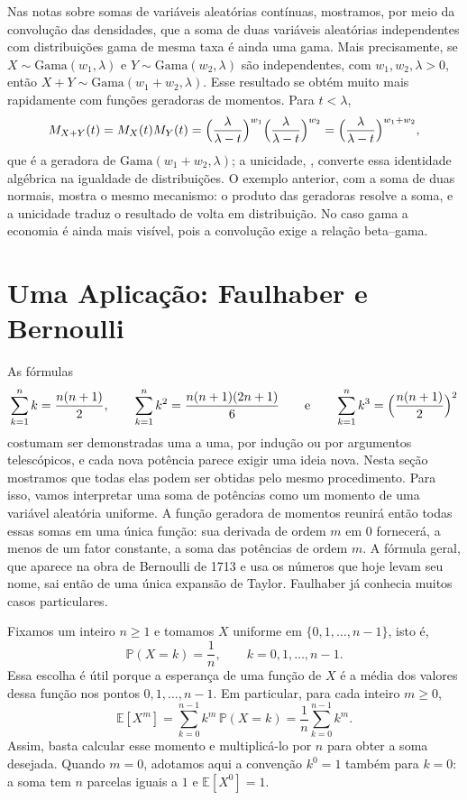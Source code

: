 \documentclass[12pt,portuguese]{article}
\theoremstyle{definition}
\theoremstyle{plainexercise}
\theoremstyle{starredexercise}
\theoremstyle{definition}
\begin{document}
Nas notas sobre somas de variáveis aleatórias contínuas, mostramos, por meio
da convolução das densidades, que a soma de duas variáveis aleatórias
independentes com distribuições gama de mesma taxa é ainda uma gama. Mais precisamente, se
$X\sim\mathrm{Gama}(w_1,\lambda)$ e $Y\sim\mathrm{Gama}(w_2,\lambda)$ são
independentes, com $w_1,w_2,\lambda>0$, então
$X+Y\sim\mathrm{Gama}(w_1+w_2,\lambda)$. Esse resultado
se obtém muito mais rapidamente com funções geradoras de momentos. Para
$t<\lambda$,
\[
M_{X+Y}(t)=M_X(t)M_Y(t)
=\Bigl(\frac{\lambda}{\lambda-t}\Bigr)^{w_1}
 \Bigl(\frac{\lambda}{\lambda-t}\Bigr)^{w_2}
=\Bigl(\frac{\lambda}{\lambda-t}\Bigr)^{w_1+w_2},
\]
que é a geradora de $\mathrm{Gama}(w_1+w_2,\lambda)$; a unicidade,
, converte essa identidade algébrica na igualdade de
distribuições. O exemplo anterior, com a soma de duas normais, mostra o mesmo
mecanismo: o produto das geradoras resolve a soma, e a unicidade traduz o
resultado de volta em distribuição. No caso gama a economia é ainda mais
visível, pois a convolução exige a relação beta--gama.

\section{Uma Aplicação: Faulhaber e Bernoulli}\label{sec:faulhaber}

As fórmulas
\[
\sum_{k=1}^{n}k=\frac{n(n+1)}{2},\qquad
\sum_{k=1}^{n}k^{2}=\frac{n(n+1)(2n+1)}{6}
\qquad\text{e}\qquad
\sum_{k=1}^{n}k^{3}=\Bigl(\frac{n(n+1)}{2}\Bigr)^{2}
\]
costumam ser demonstradas uma a uma, por indução ou por argumentos telescópicos, e cada
nova potência parece exigir uma ideia nova. Nesta seção mostramos que todas
elas podem ser obtidas pelo mesmo procedimento. Para isso, vamos interpretar
uma soma de potências como um momento de uma variável aleatória uniforme.
A função geradora de momentos reunirá então todas essas somas em uma única
função: sua derivada de ordem $m$ em $0$ fornecerá, a menos de um fator
constante, a soma das potências de ordem $m$.
A fórmula geral, que aparece na obra de Bernoulli
de 1713 e usa os números que hoje levam seu nome, sai então de uma única
expansão de Taylor. Faulhaber já conhecia muitos casos particulares.

\bigskip 

Fixamos um inteiro $n\geqslant1$ e tomamos $X$ uniforme em
$\{0,1,\dots,n-1\}$, isto é, 
\[
\mathbb{P}(X=k)= \frac{1}{n}, \qquad k=0,1,\dots,n-1. 
\]
Essa escolha é útil porque a esperança de uma função de $X$ é a média
dos valores dessa função nos pontos $0,1,\dots,n-1$.
Em particular, para cada inteiro $m\geqslant0$,
\[
\mathbb{E}[X^m]=\sum_{k=0}^{n-1}k^m\,\mathbb{P}(X=k)
=\frac1n\sum_{k=0}^{n-1}k^m.
\]
Assim, basta calcular esse momento e multiplicá-lo por $n$ para obter a
soma desejada. Quando $m=0$, adotamos aqui a convenção $k^0=1$ também
para $k=0$: a soma tem $n$ parcelas iguais a $1$ e $\mathbb{E}[X^0]=1$.
\end{document}
